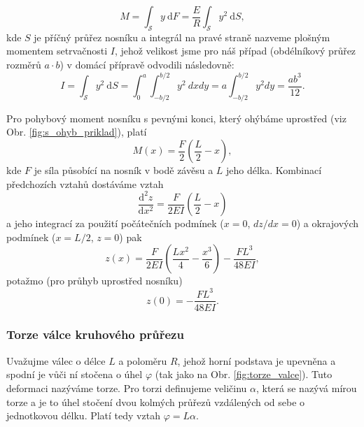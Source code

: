 \documentclass[english]{article}
\begin{document}
					\begin{equation}
					M = \int_{\mathcal{S}} y\ \mathrm{d}F = \frac{E}{R} \int_{\mathcal{S}} y^2\ \mathrm{d}S,
					\end{equation}
				   	kde $S$ je příčný průřez nosníku a integrál na pravé straně nazveme plošným momentem setrvačnosti $I$, jehož velikost jsme pro náš případ (obdélníkový průřez rozměrů $a\cdot b$) v domácí přípravě odvodili následovně:
				   	\begin{equation}
				   	I = \int_{\mathcal{S}}y^2\ \mathrm{d}S = \int_{0}^{a}\int_{-b/2}^{b/2}  y^2\ dxdy = a\int_{-b/2}^{b/2}  y^2 dy = \frac{ab^3}{12}.
				   	\end{equation}
					
					Pro pohybový moment nosníku s pevnými konci, který ohýbáme uprostřed (viz Obr. \ref{fig:s_ohyb_priklad}), platí 
					\begin{equation}
		     		M(x) = \frac{F}{2}\left( \frac{L}{2} - x \right),
					\end{equation}
					kde $F$ je síla působící na nosník v bodě závěsu a $L$ jeho délka.  Kombinací předchozích vztahů dostáváme vztah
					\begin{equation}
					\frac{\mathrm{d}^2z}{\mathrm{d}x^2} = \frac{F}{2EI}\left( \frac{L}{2} - x \right)
					\end{equation}
					a jeho integrací za použití počátečních podmínek ($x = 0$, $dz/dx=0$) a okrajových podmínek ($x=L/2$, $z=0$) pak
					\begin{equation}
					z(x) = \frac{F}{2EI} \left( \frac{Lx^2}{4} - \frac{x^3}{6} \right) - \frac{FL^3}{48 EI},
					\end{equation}
					potažmo (pro průhyb uprostřed nosníku)
					\begin{equation}\label{eq:pruhyb_tyce_ve_stredu}
					z(0) = - \frac{FL^3}{48 EI}.
					\end{equation}
		
			\subsubsection{Torze válce kruhového průřezu}
					Uvažujme válec o délce $L$ a poloměru $R$, jehož horní podstava je upevněna a spodní je vůči ní stočena o úhel $\varphi$ (tak jako na Obr. \ref{fig:torze_valce}). Tuto deformaci nazýváme torze. Pro torzi definujeme veličinu $\alpha$, která se nazývá mírou torze a je to úhel stočení dvou kolmých průřezů vzdálených od sebe o jednotkovou délku. Platí tedy vztah $\varphi = L \alpha$. 
					
\end{document}
